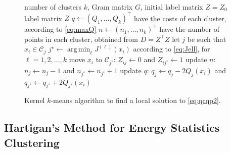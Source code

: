 \documentclass[aps,preprint,nofootinbib,floatfix]{revtex4-1}
\DeclareMathOperator*{\argmin}{arg\,min}
\newcommand\C{{\mathcal{C}}}
\begin{document}
\begin{figure}
\begin{algorithm}[H]
\vspace{.5em}
\begin{algorithmic}[1]
    \INPUT number of clusters $k$, Gram matrix $G$, initial label
    matrix $Z = Z_0$
    \OUTPUT label matrix $Z$ 
  \STATE $q \leftarrow (Q_1, \dotsc, Q_k)^\top$ 
            have the costs of each cluster, according to \eqref{eq:maxQ}
  \STATE $n \leftarrow (n_1,\dotsc,n_k)^\top$ 
        have the number of points in each cluster, obtained 
        from $D = Z^\top Z$
  \REPEAT
        \STATE let $j$ be such that $x_i \in \C_j$
        \STATE $j^\star \leftarrow \argmin_{\ell} J^{(\ell)}(x_i)$
            according to \eqref{eq:Jell}, for $\ell=1,2,\dots,k$
            \STATE move $x_i$ to $\C_{j^\star}$: $Z_{ij} \leftarrow 0$ and
            $Z_{ij^\star} \leftarrow 1$
            \STATE update $n$: $n_j \leftarrow n_j - 1$ and
                    $n_{j^\star} \leftarrow n_{j^\star} + 1$
            \STATE update $q$: $q_j \leftarrow q_j - 2Q_j(x_i)$ and
    $q_{j^\star} \leftarrow q_{j^\star} + 2Q_{j^\star}(x_i)$
        \ENDIF
    \ENDFOR
\end{algorithmic}
\caption{\label{kmeans_algo}
Kernel $k$-means algorithm 
to find a local solution to \eqref{eq:qcqp2}.
\hspace{\fill}
}
\end{algorithm}
\end{figure}

\subsection*{Hartigan's Method for Energy Statistics Clustering}
\end{document}
